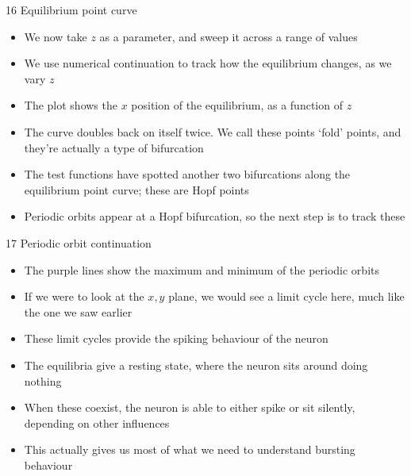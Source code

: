 \documentclass[presentation]{beamer}
\begin{document}
\begin{frame}[label={sec:org23a6d7d}]{16 Equilibrium point curve}
\begin{itemize}
\item We now take \(z\) as a parameter, and sweep it across a range of values
\item We use numerical continuation to track how the equilibrium changes, as we vary \(z\)
\item The plot shows the \(x\) position of the equilibrium, as a function of \(z\)
\item The curve doubles back on itself twice. We call these points `fold' points, and they're actually a type of bifurcation
\item The test functions have spotted another two bifurcations along the equilibrium point curve; these are Hopf points
\item Periodic orbits appear at a Hopf bifurcation, so the next step is to track these
\end{itemize}
\end{frame}

\begin{frame}[label={sec:org522a77c}]{17 Periodic orbit continuation}
\begin{itemize}
\item The purple lines show the maximum and minimum of the periodic orbits
\item If we were to look at the \(x,y\) plane, we would see a limit cycle here, much like the one we saw earlier
\item These limit cycles provide the spiking behaviour of the neuron
\item The equilibria give a resting state, where the neuron sits around doing nothing
\item When these coexist, the neuron is able to either spike or sit silently, depending on other influences
\item This actually gives us most of what we need to understand bursting behaviour
\end{itemize}
\end{frame}
\end{document}
